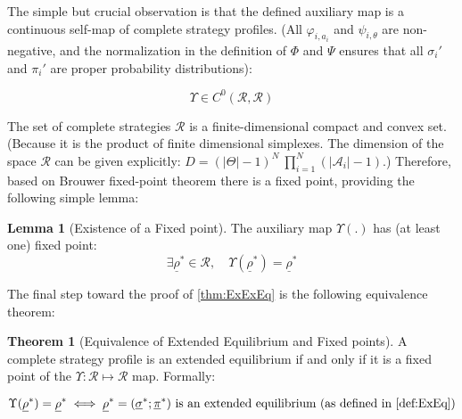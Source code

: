 \documentclass{article}
\theoremstyle{definition}
\newtheorem{theorem}{Theorem}[section]
\newtheorem{lemma}{Lemma}[section]
\begin{document}
The simple but crucial observation is that the defined auxiliary map is a continuous self-map of complete strategy profiles. (All $\varphi_{i,a_i}$ and $\psi_{i,\theta}$ are non-negative, and the normalization in the definition of $\Phi$ and $\Psi$ ensures that all $\sigma_i'$ and $\pi_i'$ are proper probability distributions):

\begin{equation}
    \Upsilon \in C^0(\mathcal{R},\mathcal{R})
\end{equation}

The set of complete strategies $\mathcal{R}$ is a finite-dimensional compact and convex set. (Because it is the product of finite dimensional simplexes. The dimension of the space $\mathcal{R}$ can be given explicitly: $D = (|\Theta|-1)^N \ \prod_{i=1}^N (|\mathcal{A}_i|-1)$.)
Therefore, based on Brouwer fixed-point theorem \cite{misc:Jiang2007,book:FixedPointTheory,book:HandbookOfTopologicalFixedPointTheory,paper:NinetyYearsOfBrouwer,paper:Brouwer1911} there is a fixed point, providing the following simple lemma:

\begin{lemma}[Existence of a Fixed point]
\label{lemma:FixedPointExists}
The auxiliary map $\Upsilon(.)$ has (at least one) fixed point:
    \begin{equation}
    \exists \underline{\rho}^* \in \mathcal{R}, \quad \Upsilon(\underline{\rho}^*) = \underline{\rho}^* 
\end{equation}
\end{lemma}

The final step toward the proof of \autoref{thm:ExExEq} is the following equivalence theorem:

\begin{theorem}[Equivalence of Extended Equilibrium and Fixed points]
\label{thm:Equivalence}
A complete strategy profile is an extended equilibrium if and only if it is a fixed point of the $\Upsilon : \mathcal{R} \mapsto \mathcal{R}$ map. Formally:

    \begin{equation}
        \Upsilon(\underline{\rho}^*) = \underline{\rho}^* \iff
        \underline{\rho}^*=(\underline{\sigma}^*;\underline{\pi}^*) \text { is an extended equilibrium (as defined in \autoref{def:ExEq})}
    \end{equation}
\end{theorem}
\end{document}
